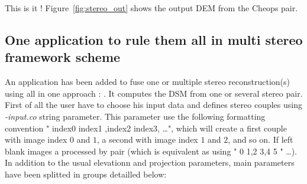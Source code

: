 This is it ! Figure~\ref{fig:stereo_out} shows the output DEM from the Cheops pair.

\subsection{One application to rule them all in multi stereo framework scheme}
An application has been added to fuse one or multiple stereo
reconstruction(s) using all in one approach :
. It computes the DSM 
from one or several stereo pair. First of all the user have to choose his input
data and defines stereo couples using \textit{-input.co} string parameter. This
parameter use the following formatting convention " index0  index1 ,index2
  index3, \ldots ", which will create a first couple with image index $0$ and
$1$, a second with image index $1$ and
$2$, and so on. If left blank images a processed by pair (which is equivalent
as using " 0 1,2 3,4 5 " \ldots). 
In addition to the usual elevationn and projection parameters,
main parameters have been splitted in  groups detailled below:
